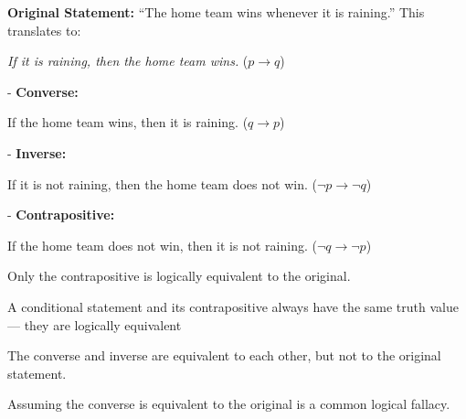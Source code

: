 \begin{tcolorbox}[title=Example: Rewriting the Conditional Statement]
\textbf{Original Statement:} “The home team wins whenever it is raining.”  
This translates to: 
\begin{center}
\textit{If it is raining, then the home team wins.} ($p \rightarrow q$)    
\end{center}
- \textbf{Converse:}  
\begin{center}
If the home team wins, then it is raining. ($q \rightarrow p$)     
\end{center}
- \textbf{Inverse:} 
\begin{center}
If it is not raining, then the home team does not win. ($\neg p \rightarrow \neg q$)      
\end{center}
- \textbf{Contrapositive:} 
\begin{center}
If the home team does not win, then it is not raining. ($\neg q \rightarrow \neg p$)    
\end{center}
Only the contrapositive is logically equivalent to the original.
\end{tcolorbox}
\begin{tcolorbox}[colback=white, colframe=gray!60, title=Remark 1]
A conditional statement and its contrapositive always have the same truth value — they are logically equivalent  
\end{tcolorbox}
\begin{tcolorbox}[colback=white, colframe=gray!60, title=Remark 2]
The converse and inverse are equivalent to each other, but not to the original statement.   
\end{tcolorbox}
\begin{tcolorbox}[colback=white, colframe=gray!60, title=Remark 3]
Assuming the converse is equivalent to the original is a common logical fallacy.   
\end{tcolorbox}







\newpage

